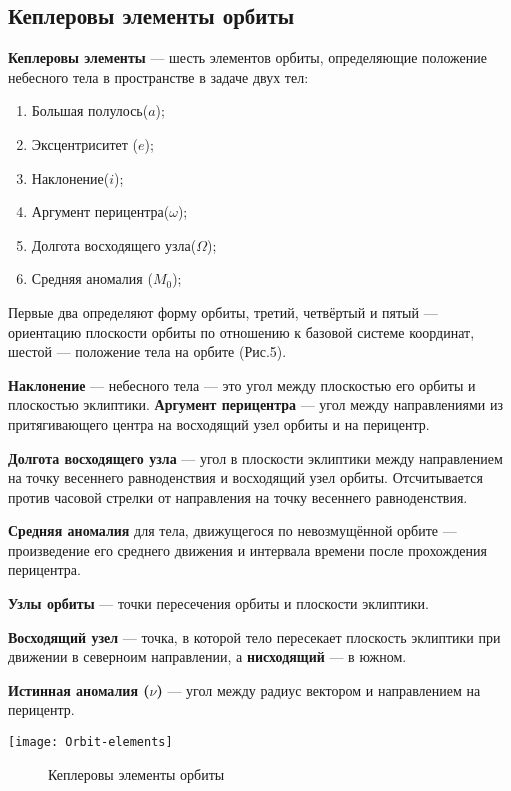 \subsection{Кеплеровы элементы орбиты}

\textbf{Кеплеровы элементы} --- шесть элементов орбиты, определяющие положение небесного тела в пространстве в задаче двух тел:
\begin{enumerate}
\item Большая полулось($a$);
\item Эксцентриситет ($e$);
\item Наклонение($i$);
\item Аргумент перицентра($\omega$);
\item Долгота восходящего узла($\Omega$);
\item Средняя аномалия ($M_0$);
\end{enumerate}
Первые два определяют форму орбиты, третий, четвёртый и пятый — ориентацию плоскости орбиты по отношению к базовой системе координат, шестой — положение тела на орбите (Рис.5).

\textbf{Наклонение} --- небесного тела — это угол между плоскостью его орбиты и плоскостью эклиптики.
\textbf{Аргумент перицентра} --- угол между направлениями из притягивающего центра на восходящий узел орбиты и на перицентр.

\textbf{Долгота восходящего узла} --- угол в плоскости эклиптики между направлением на точку весеннего равноденствия и восходящий узел орбиты. Отсчитывается против часовой стрелки от направления на точку весеннего равноденствия.

\textbf{Средняя аномалия} для тела, движущегося по невозмущённой орбите --- произведение его среднего движения и интервала времени после прохождения перицентра.

\textbf{Узлы орбиты} --- точки пересечения орбиты и плоскости эклиптики.

\textbf{Восходящий узел} --- точка, в которой тело пересекает плоскость эклиптики при движении в северноим направлении, а \textbf{нисходящий} --- в южном.

\textbf{Истинная аномалия ($\nu$)} --- угол между радиус вектором и направлением на перицентр.
\begin{center}
\texttt{[image: Orbit-elements]}
\begin{figure}[h!]
\caption{Кеплеровы элементы орбиты}
\end{figure}
\end{center}